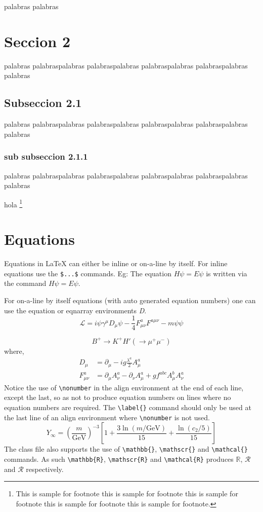 \documentclass{CUP-JNL-DTM}%
\theoremstyle{definition}
\numberwithin{equation}{section}
\begin{document}
palabras palabras

\section[Seccion 2]{Seccion 2}
palabras palabraspalabras palabraspalabras palabraspalabras palabraspalabras palabras
\subsection{Subseccion 2.1}
palabras palabraspalabras palabraspalabras palabraspalabras palabraspalabras palabras
\subsubsection{sub subseccion 2.1.1}
palabras palabraspalabras palabraspalabras palabraspalabras palabraspalabras palabras

hola \footnote{This is sample for footnote this is sample for footnote this is sample for footnote  this is sample for footnote this is sample for footnote.}

\section{Equations}

Equations in \LaTeX{} can either be inline or on-a-line by itself. For
inline equations use the \verb+$...$+ commands. Eg: The equation
$H\psi = E \psi$ is written via the command $H \psi = E \psi$.

For on-a-line by itself equations (with auto generated equation numbers)
one can use the equation or eqnarray environments \textit{D}.
\begin{equation}
\mathcal{L} = i {\psi} \gamma^\mu D_\mu \psi
    - \frac{1}{4} F_{\mu\nu}^a F^{a\mu\nu} - m {\psi} \psi
\label{eq1}
\end{equation}

\begin{equation}
    B^{+} \rightarrow K^{+}H' (\rightarrow \mu^{+} \mu^{-})
\end{equation}
where,
\begin{align}
D_\mu &=  \partial_\mu - ig \frac{\lambda^a}{2} A^a_\mu
\nonumber \\
F^a_{\mu\nu} &= \partial_\mu A^a_\nu - \partial_\nu A^a_\mu
    + g f^{abc} A^b_\mu A^a_\nu
\label{eq2}
\end{align}
Notice the use of \verb+\nonumber+ in the align environment at the end
of each line, except the last, so as not to produce equation numbers on
lines where no equation numbers are required. The \verb+\label{}+ command
should only be used at the last line of an align environment where
\verb+\nonumber+ is not used.
\begin{equation}
Y_\infty = \left( \frac{m}{\textrm{GeV}} \right)^{-3}
    \left[ 1 + \frac{3 \ln(m/\textrm{GeV})}{15}
    + \frac{\ln(c_2/5)}{15} \right]
\end{equation}
The class file also supports the use of \verb+\mathbb{}+, \verb+\mathscr{}+ and
\verb+\mathcal{}+ commands. As such \verb+\mathbb{R}+, \verb+\mathscr{R}+
and \verb+\mathcal{R}+ produces $\mathbb{R}$, $\mathscr{R}$ and $\mathcal{R}$
respectively.
\end{document}
